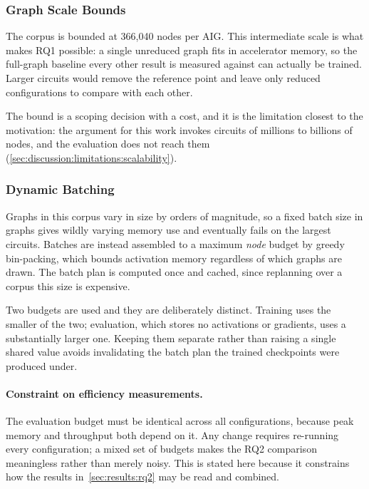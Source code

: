 
\subsubsection{Graph Scale Bounds}
\label{sec:method:experiment:scale}
The corpus is bounded at 366,040 nodes per AIG\@. This intermediate scale is what makes RQ1
possible: a single unreduced graph fits in accelerator memory, so the full-graph baseline
every other result is measured against can actually be trained. Larger circuits would remove
the reference point and leave only reduced configurations to compare with each other.

The bound is a scoping decision with a cost, and it is the limitation closest to the
motivation: the argument for this work invokes circuits of millions to billions of nodes, and
the evaluation does not reach them
(\ref{sec:discussion:limitations:scalability}).

\subsubsection{Dynamic Batching}
\label{sec:method:experiment:batching}
Graphs in this corpus vary in size by orders of magnitude, so a fixed batch size in graphs
gives wildly varying memory use and eventually fails on the largest circuits. Batches are
instead assembled to a maximum \emph{node} budget by greedy bin-packing, which bounds
activation memory regardless of which graphs are drawn. The batch plan is computed once and
cached, since replanning over a corpus this size is expensive.

Two budgets are used and they are deliberately distinct. Training uses the smaller of the
two; evaluation, which stores no activations or gradients, uses a substantially larger one.
Keeping them separate rather than raising a single shared value avoids invalidating the batch
plan the trained checkpoints were produced under.

\paragraph{Constraint on efficiency measurements.}
The evaluation budget must be identical across all configurations, because peak memory and
throughput both depend on it. Any change requires re-running every configuration; a mixed set
of budgets makes the RQ2 comparison meaningless rather than merely noisy. This is stated here
because it constrains how the results in~\ref{sec:results:rq2} may be read and combined.

